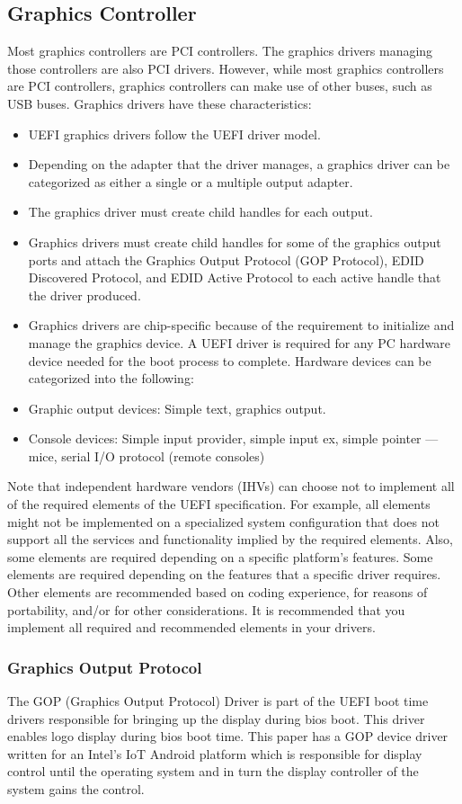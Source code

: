 \subsection{Graphics Controller}
Most graphics controllers are PCI controllers. The graphics drivers managing those controllers are also PCI drivers. However, while most graphics controllers are PCI controllers, graphics controllers can make use of other buses, such as USB buses. Graphics drivers have these characteristics:
\begin{itemize}
	\item UEFI graphics drivers follow the UEFI driver model.
	\item Depending on the adapter that the driver manages, a graphics driver can be categorized as either a single or a multiple output adapter.
	\item The graphics driver must create child handles for each output.
	\item Graphics drivers must create child handles for some of the graphics output ports and attach the Graphics Output Protocol (GOP Protocol), EDID Discovered Protocol, and EDID Active Protocol to each active handle that the driver produced.
	\item Graphics drivers are chip-specific because of the requirement to initialize and manage the graphics device.
A UEFI driver is required for any PC hardware device needed for the boot process to complete. Hardware devices can be categorized into the following:
	\item Graphic output devices: Simple text, graphics output.
	\item Console devices: Simple input provider, simple input ex, simple pointer — mice, serial I/O protocol (remote consoles) 
\end{itemize}
Note that independent hardware vendors (IHVs) can choose not to implement all of the required elements of the UEFI specification. For example, all elements might not be implemented on a specialized system configuration that does not support all the services and functionality implied by the required elements. Also, some elements are required depending on a specific platform's features. Some elements are required depending on the features that a specific driver requires. Other elements are recommended based on coding experience, for reasons of portability, and/or for other considerations. It is recommended that you implement all required and recommended elements in your drivers.

\subsubsection{Graphics Output Protocol}
The GOP (Graphics Output Protocol) Driver is part of the UEFI boot time drivers responsible for bringing up the display during bios boot. This driver enables logo display during bios boot time. This paper has a GOP device driver written for an Intel’s IoT Android platform which is responsible for display control until the operating system and in turn the display controller of the system gains the control.

